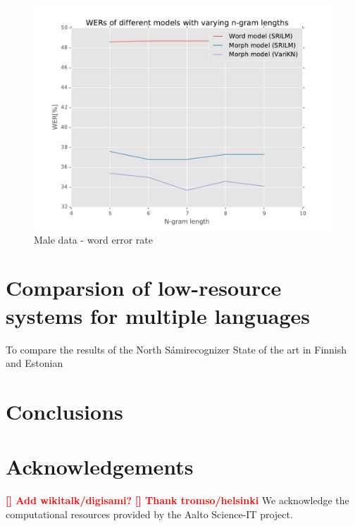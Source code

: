 \documentclass[b5paper]{article}
\newcommand{\todo}[2]{{\textcolor{red}{\bf [#1] #2 }}}
\newcommand{\ns}{{North Sámi}}
\begin{document}
\begin{figure}[h!]
\includegraphics[width=.6\textwidth]{figures/smeM-complete_wikipedia-wer}
\caption{Male data - word error rate}
\end{figure}

\section{Comparsion of low-resource systems for multiple languages}
To compare the results of the \ns recognizer 
State of the art in Finnish \cite{hirsimaki2006unlimited} and Estonian \cite{kurimo2015modeling}
\section{Conclusions} 

\section{Acknowledgements} 
\todo{}{Add wikitalk/digisami?} \todo{}{Thank tromso/helsinki} 
We acknowledge the computational resources provided by the Aalto Science-IT project.




 
\end{document}
